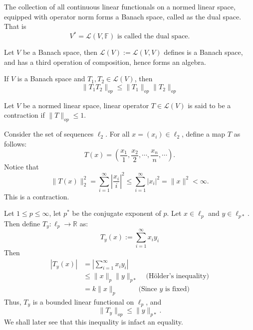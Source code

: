 \vspace{0.4cm}
\begin{definition}
    The collection of all continuous linear functionals on a normed linear space, equipped with operator norm forms a Banach space, called as the dual space. That is $$V^{*}=\mathcal{L}(V,\mathbb{F})\text{ is called the dual space.}$$
\end{definition}
\vspace{0.4cm}
\begin{definition}
    Let $V$ be a Banach space, then $\mathcal{L}(V):=\mathcal{L}(V,V)$ defines is a Banach space, and has a third operation of composition, hence forms an algebra.
\end{definition}
\vspace{0.4cm}
\begin{note}
    If $V$ is a Banach space and $T_{1},T_{2}\in \mathcal{L}(V)$, then $$\|T_{1}T_{2}\|_{op}\leq\|T_{1}\|_{op}\|T_{2}\|_{op}$$
\end{note}
\vspace{0.4cm}
\begin{definition}[Contraction]
    Let $V$ be a normed linear space, linear operator $T\in \mathcal{L}(V)$ is said to be a contraction if $\|T\|_{op}\leq1$.
\end{definition}
\vspace{0.4cm}
\begin{eg}
    Consider the set of sequences $\ell_{2}$. For all $x=(x_{i})\in\ell_{2}$, define a map $T$ as follows: $$T(x)=\left(\frac{x_{1}}{1},\frac{x_{2}}{2},\cdots,\frac{x_{n}}{n},\cdots\right).$$
    Notice that $$\|T(x)\|_{2}^{2}=\sum_{i=1}^{\infty}\left|\frac{x_{i}}{i}\right|^{2}\leq\sum_{i=1}^{\infty}|x_{i}|^{2}=\|x\|^{2}<\infty.$$
    This is a contraction.
\end{eg}
\vspace{0.4cm}
\begin{eg}
Let $1\leq p\leq\infty$, let $p^{*}$ be the conjugate exponent of $p$. Let $x\in\ell_{p}$ and $y\in\ell_{p*}$. Then define $T_{y}:\ell_{p}\to \mathbb{R}$ as:
$$T_{y}(x):=\sum_{i=1}^{\infty}x_{i}y_{i}$$
Then
$$
\begin{aligned}
    |T_{y}(x)|&=\left|\sum_{i=1}^{\infty}x_{i}y_{i}\right|\\
              &\leq\|x\|_{p}\|y\|_{p*}\quad\text{(H\"older's inequality)}\\ 
              &=k\|x\|_{p}\quad\quad\quad\text{(Since $y$ is fixed)}
\end{aligned}
$$
Thus, $T_{y}$ is a bounded linear functional on $\ell_{p}$, and $$\|T_{y}\|_{op}\leq\|y\|_{p*}.$$
We shall later see that this inequality is infact an equality.
\end{eg}
\vspace{0.4cm}
